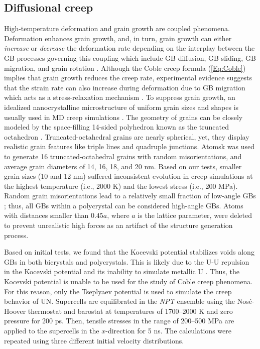 \documentclass[preprint, 12pt]{elsarticle}
\newcommand{\?}{\stackrel{?}{=}}
\begin{document}
\subsection{Diffusional creep}

High-temperature deformation and grain growth are coupled phenomena. Deformation enhances grain growth, and, in turn, grain growth can either \textit{increase} or \textit{decrease} the deformation rate depending on the interplay between the GB processes governing this coupling which include GB diffusion, GB sliding, GB migration, and grain rotation \cite{Haslam2004}. Although the Coble creep formula (\cref{Eq:Coble}) implies that grain growth reduces the creep rate, experimental evidence suggests that the strain rate can also increase during deformation due to GB migration which acts as a stress-relaxation mechanism \cite{Haslam2004}. To suppress grain growth, an idealized nanocrystalline microstructure of uniform grain sizes and shapes is usually used in MD creep simulations \cite{Keblinski1998, Yamakov2002}. The geometry of grains can be closely modeled by the space-filling 14-sided polyhedron known as the truncated octahedron \cite{Yamakov2002, Olander2017}. Truncated-octahedral grains are nearly spherical, yet, they display realistic grain features like triple lines and quadruple junctions. Atomsk \cite{Hirel2015} was used to generate 16 truncated-octahedral grains with random misorientations, and average grain diameters of 14, 16, 18, and 20 nm. Based on our tests, smaller grain sizes (10 and 12 nm) suffered inconsistent evolution in creep simulations at the highest temperature (i.e., 2000 K) and the lowest stress (i.e., 200 MPa). Random grain misorientations lead to a relatively small fraction of low-angle GBs \cite{Yamakov2002, Haslam2004}; thus, all GBs within a polycrystal can be considered high-angle GBs. Atoms with distances smaller than $0.45a$, where $a$ is the lattice parameter, were deleted to prevent unrealistic high forces as an artifact of the structure generation process.

Based on initial tests, we found that the Kocevski potential stabilizes voids along GBs in both bicrystals and polycrystals. This is likely due to the U-U repulsion in the Kocevski potential and its inability to simulate metallic U \cite{AbdulHameed2024}. Thus, the Kocevski potential is unable to be used for the study of Coble creep phenomena. For this reason, only the Tseplyaev potential is used to simulate the creep behavior of UN. Supercells are equilibrated in the \textit{NPT} ensemble using the Nosé-Hoover thermostat and barostat at temperatures of 1700--2000 K and zero pressure for 200 ps. Then, tensile stresses in the range of 200--500 MPa are applied to the supercells in the $x$-direction for 5 ns. The calculations were repeated using three different initial velocity distributions.
\end{document}
